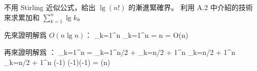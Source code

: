 不用 Stirling 近似公式，給出 $\lg(n!)$ 的漸進緊確界。
利用 A.2 中介紹的技術來求累加和 $\sum_{k=1}^n\lg{k}$。
\stopEXERCISE

\startANSWER
先來證明解爲 $O(n\lg{n})$：
\startformula
\sum_{k=1}^n \le \sum_{k=1}^n = n = O(n)
\stopformula

再來證明解爲 ：
\startsplitformula\startmathalignment
\NC \sum_{k=1}^n
   \NC= \sum_{k=1}^{\lfloor n/2 \rfloor} +
	\sum_{k=\lfloor n/2 \rfloor + 1}^n \NR
\NC\NC\ge \sum_{k=\lfloor n/2 \rfloor + 1}^n \NR
\NC\NC\ge \sum_{k=\lfloor n/2 \rfloor + 1}^n \NR
\NC\NC\ge (-1) \NR
\NC\NC\ge (-1)(-1) \NR
\NC\NC= \Omega(n) \NR
\stopmathalignment\stopsplitformula
\stopANSWER
